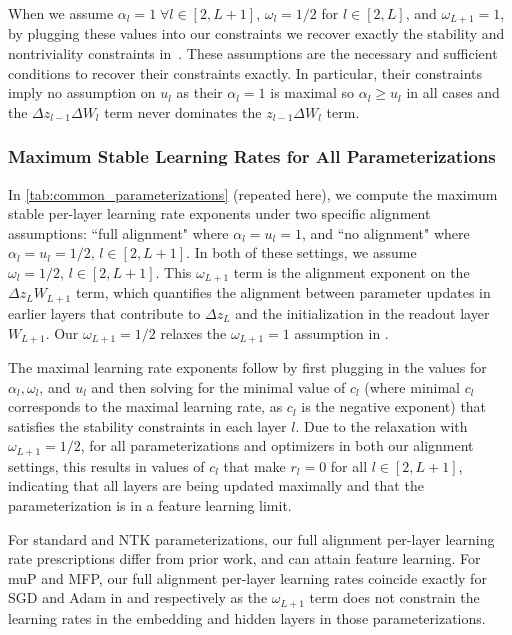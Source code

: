 When we assume $\alpha_l = 1 \;\forall l \in [2, L+1]$, $\omega_l = 1/2$ for $l \in [2, L]$, and $\omega_{L+1} = 1$, by plugging these values into our constraints we recover exactly the stability and nontriviality constraints in~\citet{yang2021tensoriv,yang2023tensorivb}. These assumptions are the necessary and sufficient conditions to recover their constraints exactly. In particular, their constraints imply no assumption on $u_l$ as their $\alpha_l = 1$ is maximal so $\alpha_l \geq u_l$ in all cases and the $\Delta z_{l-1} \Delta W_l$ term never dominates the $z_{l-1} \Delta W_l$ term.


\subsubsection{Maximum Stable Learning Rates for All Parameterizations}

In \cref{tab:common_parameterizations} (repeated here), we compute the maximum stable per-layer learning rate exponents under two specific alignment assumptions: ``full alignment" where $\alpha_l = u_l = 1$, and ``no alignment" where $\alpha_l = u_l = 1/2,\,l \in [2, L+1]$. In both of these settings, we assume $\omega_{l} = 1/2,\, l\in[2, L+1]$. This $\omega_{L+1}$ term is the alignment exponent on the $\Delta z_{L} W_{L+1}$ term, which quantifies the alignment between parameter updates in earlier layers that contribute to $\Delta z_L$ and the initialization in the readout layer $W_{L+1}$. Our $\omega_{L+1} = 1/2$ relaxes the $\omega_{L+1} = 1$ assumption in \citet{yang2021tensoriv,yang2023tensorivb}.

The maximal learning rate exponents follow by first plugging in the values for $\alpha_l, \omega_l$, and $u_l$ and then solving for the minimal value of $c_l$ (where minimal $c_l$ corresponds to the maximal learning rate, as $c_l$ is the negative exponent) that satisfies the stability constraints in each layer $l$. Due to the relaxation with $\omega_{L+1} = 1/2$, for all parameterizations and optimizers in both our alignment settings, this results in values of $c_l$ that make $r_l = 0$ for all $l \in [2,L+1]$, indicating that all layers are being updated maximally and that the parameterization is in a feature learning limit.

For standard and NTK parameterizations, our full alignment per-layer learning rate prescriptions differ from prior work, and can attain feature learning. For muP and MFP, our full alignment per-layer learning rates coincide exactly for SGD and Adam in \citet{yang2021tensoriv} and \citet{yang2023tensorivb} respectively as the $\omega_{L+1}$ term does not constrain the learning rates in the embedding and hidden layers in those parameterizations.

